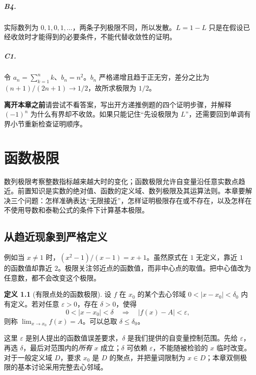 \documentclass[UTF8,fontset=fandol,12pt,oneside,openany]{ctexrep}
\theoremstyle{definition}
\newtheorem{definition}[theorem]{定义}
\begin{document}
\paragraph{B4.} 实际数列为 $0,1,0,1,\ldots$，两条子列极限不同，所以发散。$L=1-L$ 只是在假设已经收敛时才能得到的必要条件，不能代替收敛性的证明。
\paragraph{C1.} 令 $a_n=\sum_{k=1}^nk$、$b_n=n^2$。$b_n$ 严格递增且趋于正无穷，差分之比为 $(n+1)/(2n+1)\to1/2$，故所求极限为 $1/2$。


\textbf{离开本章之前}\quad 请尝试不看答案，写出开方递推例题的四个证明步骤，并解释 $(-1)^n$ 为什么有界却不收敛。如果只能记住“先设极限为 $L$”，还需要回到单调有界小节重新检查证明顺序。


\chapter{函数极限}
\label{lec:03:chapter}

数列极限考察整数指标越来越大时的变化；函数极限允许自变量沿任意实数点趋近。前置知识是实数的绝对值、函数的定义域、数列极限及其运算法则。本章要解决三个问题：怎样准确表达“无限接近”，怎样证明极限存在或不存在，以及怎样在不使用导数和泰勒公式的条件下计算基本极限。

\section{从趋近现象到严格定义}
\label{lec:03:definition}
例如当 $x\ne1$ 时，$(x^2-1)/(x-1)=x+1$。虽然原式在 $1$ 无定义，靠近 $1$ 的函数值却靠近 $2$。极限关注邻近点的函数值，而非中心点的取值。把中心值改为任意数，都不会改变这个极限。

\begin{definition}[有限点处的函数极限]
设 $f$ 在 $x_0$ 的某个去心邻域 $0<|x-x_0|<\delta_0$ 内有定义。若对任意 $\varepsilon>0$，存在 $\delta>0$，使得
\[
0<|x-x_0|<\delta\quad\Longrightarrow\quad |f(x)-A|<\varepsilon,
\]
则称 $\lim_{x\to x_0}f(x)=A$。可以总取 $\delta\le\delta_0$。
\end{definition}
这里 $\varepsilon$ 是别人提出的函数值误差要求，$\delta$ 是我们提供的自变量控制范围。先给 $\varepsilon$，再选 $\delta$，最后对范围内的\emph{所有} $x$ 成立；$\delta$ 可依赖 $\varepsilon$，不能随被检验的 $x$ 临时改变。对于一般定义域 $D$，要求 $x_0$ 是 $D$ 的聚点，并把量词限制为 $x\in D$；本章双侧极限的基本讨论采用完整去心邻域。
\end{document}
